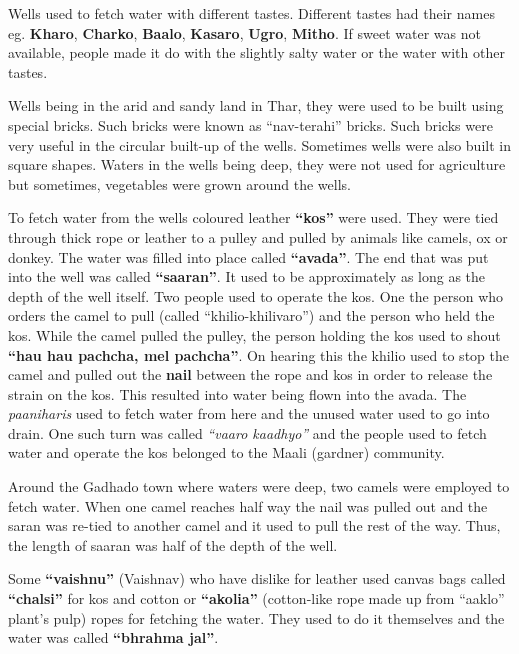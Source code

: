 Wells used to fetch water with different tastes. Different tastes had their
names eg. \textbf{Kharo}, \textbf{Charko}, \textbf{Baalo}, \textbf{Kasaro},
\textbf{Ugro}, \textbf{Mitho}. If sweet water was not available, people made it
do with the slightly salty water or the water with other tastes.

Wells being in the arid and sandy land in Thar, they were used to be built using
special bricks. Such bricks were known as ``nav-terahi'' bricks. Such bricks
were very useful in the circular built-up of the wells. Sometimes wells were
also built in square shapes. Waters in the wells being deep, they were not used
for agriculture but sometimes, vegetables were grown around the wells.

To fetch water from the wells coloured leather \textbf{``kos''} were used. They
were tied through thick rope or leather to a pulley and pulled by animals like
camels, ox or donkey. The water was filled into place called \textbf{``avada''}.
The end that was put into the well was called \textbf{``saaran''}. It used to be
approximately as long as the depth of the well itself. Two people used to
operate the kos. One the person who orders the camel to pull (called
``khilio-khilivaro'') and the person who held the kos. While the camel pulled
the pulley, the person holding the kos used to shout \textbf{``hau hau pachcha,
mel pachcha''}. On hearing this the khilio used to stop the camel and pulled out
the \textbf{nail} between the rope and kos in order to release the strain on the
kos. This resulted into water being flown into the avada. The
\textit{paaniharis} used to fetch water from here and the unused water used to
go into drain. One such turn was called \textit{``vaaro kaadhyo''} and the
people used to fetch water and operate the kos belonged to the Maali (gardner) community.

Around the Gadhado town where waters were deep, two camels were employed to
fetch water. When one camel reaches half way the nail was pulled out and the
saran was re-tied to another camel and it used to pull the rest of the way.
Thus, the length of saaran was half of the depth of the well.

Some \textbf{``vaishnu''} (Vaishnav) who have dislike for leather used canvas
bags called \textbf{``chalsi''} for kos and cotton or \textbf{``akolia''}
(cotton-like rope made up from ``aaklo'' plant's pulp) ropes for fetching the
water. They used to do it themselves and the water was called \textbf{``bhrahma
jal''}.

